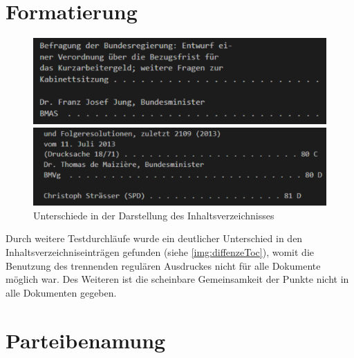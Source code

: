\section{Formatierung}
\begin{figure}[h]
	\begin{minipage}{.49\linewidth}
		\includegraphics[width=\linewidth]{img/toc17.pdf}
	\end{minipage}\hfill
	\begin{minipage}{.49\linewidth}
		\includegraphics[width=\linewidth]{img/toc18.pdf}
	\end{minipage}
	\caption{Unterschiede in der Darstellung des Inhaltsverzeichnisses}
	\label{img:diffenzeToc}
\end{figure}

\noindent
Durch weitere Testdurchläufe wurde ein deutlicher Unterschied in den Inhaltsverzeichniseinträgen gefunden (siehe \autoref{img:diffenzeToc}), womit die Benutzung des trennenden regulären Ausdruckes nicht für alle Dokumente möglich war.  Des Weiteren ist die scheinbare Gemeinsamkeit der Punkte nicht in alle Dokumenten gegeben.\\


\section{Parteibenamung}
